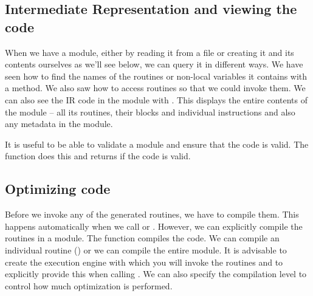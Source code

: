 \documentclass[article]{jss}
\begin{document}
\subsection{Intermediate Representation and viewing the code}
When we have a module, either by reading it from a file or creating it
and its contents ourselves as we'll see below, we can query it in
different ways.  We have seen how to find the names of the routines or
non-local variables it contains with a  method.
We also saw how to access routines so that we could invoke them.
We can also see the IR code in the module with .
This displays the entire contents of the module -- all its routines,
their blocks and individual instructions and also any metadata in
the module.

It is useful to be able to validate a module and ensure that the code
is valid.  The function  does this
and returns \Rtrue{} if the code is valid.





\subsection{Optimizing code}
Before we invoke any of the generated routines, we have to compile
them. This happens automatically when we call  or
.  However, we can explicitly compile the routines in a
module.  The function  compiles the code.  We can
compile an individual routine () or we can compile the
entire module.  It is advisable to create the execution engine with
which you will invoke the routines and to explicitly provide
this when calling .
We can also specify the compilation level to control
how much optimization is performed.
\end{document}
